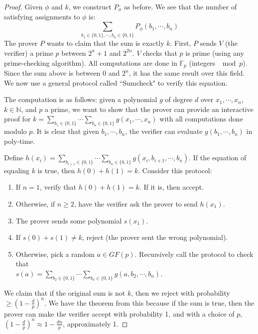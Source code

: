 \begin{proof}
Given $\phi$ and $k$, we construct $P_{\phi}$ as before. We see that the number of satisfying assignments to $\phi$ is:
\[
\sum_{b_1 \in \{0, 1\}, \cdots, b_n \in \{0, 1\}} P_{\phi}(b_1, \cdots, b_n)
\]
The prover $P$ wants to claim that the sum is exactly $k$. First, $P$ sends $V$ (the verifier) a prime $p$ between $2^n+1$ and $2^{2n}$. $V$ checks that $p$ is prime (using any prime-checking algorithm). All computations are done in $\mathbb{F}_p$ (integers $\mod p$). Since the sum above is between 0 and $2^n$, it has the same result over this field. We now use a general protocol called ``Sumcheck" to verify this equation.

\par The computation is as follows: given a polynomial $g$ of degree $d$ over $x_1, \cdots, x_n$, $k \in \mathbb{N}$, and $p$ a prime, we want to show that the prover can provide an interactive proof for $k = \sum_{b_1 \in \{0, 1\}} \cdots \sum_{b_n \in \{0, 1\}} g(x_1, \cdots, x_n)$ with all computations done modulo $p$. It is clear that given $b_1, \cdots, b_n$, the verifier can evaluate $g(b_1, \cdots, b_n)$ in poly-time.

\par Define $h(x_i) = \sum_{b_{i+1} \in \{0, 1\}} \cdots \sum_{b_n \in \{0, 1\}} g(x_i, b_{i+1}, \cdots, b_n)$. If the equation of equaling $k$ is true, then $h(0) + h(1) = k$. Consider this protocol:
\begin{enumerate}
\item If $n=1$, verify that $h(0) + h(1) = k$. If it is, then accept.
\item Otherwise, if $n \ge 2$, have the verifier ask the prover to send $h(x_1)$.
\item The prover sends some polynomial $s(x_1)$.
\item If $s(0) + s(1) \ne k$, reject (the prover sent the wrong polynomial). 
\item Otherwise, pick a random $a \in GF(p)$. Recursively call the protocol to check that\\ $s(a) = \sum_{b_2 \in \{0, 1\}} \cdots \sum_{b_n \in \{0, 1\}} g(a, b_2, \cdots, b_n)$. 
\end{enumerate}

We claim that if the original sum is not $k$, then we reject with probability $\ge (1-\frac{d}{p})^n$. We have the theorem from this because if the sum is true, then the prover can make the verifier accept with probability 1, and with a choice of $p$, $(1-\frac{d}{p})^n \approx 1-\frac{dn}{p}$, approximately 1. 


\end{proof}
